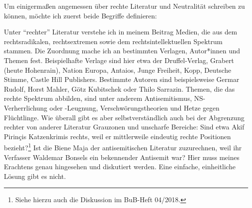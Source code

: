 \documentclass[a4paper,
fontsize=11pt,
oneside,
numbers=noperiodatend,
parskip=half-,
bibliography=totoc,
final
]{scrartcl}
\begin{document}
Um einigermaßen angemessen über rechte Literatur und Neutralität
schreiben zu können, möchte ich zuerst beide Begriffe definieren:

Unter \enquote{rechter} Literatur verstehe ich in meinem Beitrag Medien,
die aus dem rechtsradikalen, rechtsextremen sowie dem
rechtsintellektuellen Spektrum stammen. Die Zuordnung mache ich an
bestimmten Verlagen, Autor*innen und Themen fest. Beispielhafte Verlage
sind hier etwa der Druffel-Verlag, Grabert (heute Hohenrain), Nation
Europa, Antaios, Junge Freiheit, Kopp, Deutsche Stimme, Castle Hill
Publishers. Bestimmte Autoren sind beispielsweise Germar Rudolf, Horst
Mahler, Götz Kubitschek oder Thilo Sarrazin. Themen, die das rechte
Spektrum abbilden, sind unter anderem Antisemitismus, NS-Verherrlichung
oder -Leugnung, Verschwörungstheorien und Hetze gegen Flüchtlinge. Wie
überall gibt es aber selbstverständlich auch bei der Abgrenzung rechter
von anderer Literatur Grauzonen und unscharfe Bereiche: Sind etwa Akif
Pirinçis Katzenkrimis rechts, weil er mittlerweile eindeutig rechte
Positionen bezieht?\footnote{Siehe hierzu auch die Diskussion im
  BuB-Heft 04/2018.} Ist die Biene Maja der antisemitischen Literatur
zuzurechnen, weil ihr Verfasser Waldemar Bonsels ein bekennender
Antisemit war? Hier muss meines Erachtens genau hingesehen und
diskutiert werden. Eine einfache, einheitliche Lösung gibt es nicht.
\end{document}
